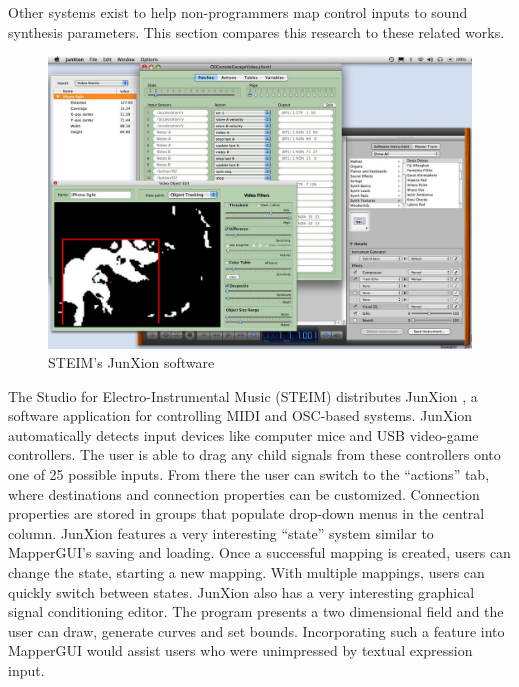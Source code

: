 Other systems exist to help non-programmers map control inputs to sound synthesis parameters. This section compares this research to these related works.

\begin{figure}
	\centering
		\includegraphics[width=\textwidth]{figures/junXion_v4}
		\caption{STEIM's JunXion software}
		\label{fig:junxion}
\end{figure}

The Studio for Electro-Instrumental Music (STEIM) distributes JunXion \cite{junxion}, a software application for controlling MIDI and OSC-based systems. JunXion automatically detects input devices like computer mice and USB video-game controllers. The user is able to drag any child signals from these controllers onto one of 25 possible inputs.  From there the user can switch to the ``actions'' tab, where destinations and connection properties can be customized. Connection properties are stored in groups that populate drop-down menus in the central column. JunXion features a very interesting ``state'' system similar to MapperGUI's saving and loading. Once a successful mapping is created, users can change the state, starting a new mapping. With multiple mappings, users can quickly switch between states. JunXion also has a very interesting graphical signal conditioning editor. The program presents a two dimensional field and the user can draw, generate curves and set bounds. Incorporating such a feature into MapperGUI would assist users who were unimpressed by textual expression input.

